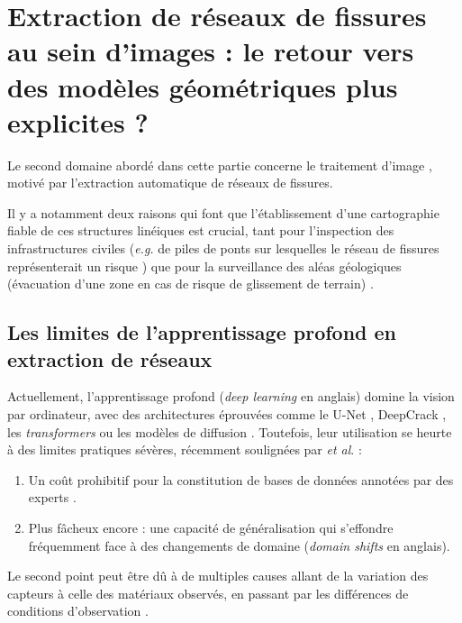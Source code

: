 \section{Extraction de réseaux de fissures au sein d'images : le retour vers des modèles géométriques plus explicites ?}

Le second domaine abordé dans cette partie concerne le traitement d'image \cite{jain1989fundamentals, Zerubia1995, Gonzalez2018ImageProcessing}, motivé par l'extraction automatique de réseaux de fissures. 

Il y a notamment deux raisons qui font que l'établissement d'une cartographie fiable de ces structures linéiques est crucial, tant pour l'inspection des infrastructures civiles (\emph{e.g.} de piles de ponts sur lesquelles le réseau de fissures représenterait un risque \cite{cerema_iqoa_ponts_dalles}) que pour la surveillance des aléas géologiques (évacuation d'une zone en cas de risque de glissement de terrain) \cite{bird2016coastal, fauchard2023diachronic}. 

\subsection{Les limites de l'apprentissage profond en extraction de réseaux}

Actuellement, l'apprentissage profond (\emph{deep learning} en anglais) domine la vision par ordinateur, avec des architectures éprouvées comme le U-Net \cite{Unet2015}, DeepCrack \cite{DeepCrack2019}, les \emph{transformers} \cite{CrackFormer2021} ou les modèles de diffusion \cite{CrackSegDiff2024}. 
Toutefois, leur utilisation se heurte à des limites pratiques sévères, récemment soulignées par  \emph{et al}. \cite{Zhang2025Review} : 
\begin{enumerate}
    \item Un coût prohibitif pour la constitution de bases de données annotées par des experts \cite{JosianeGANCrack2020}. 
    \item Plus fâcheux encore : une capacité de généralisation qui s'effondre fréquemment face à des changements de domaine \cite{Zhang2025Review} (\emph{domain shifts} en anglais).
\end{enumerate}

Le second point peut être dû à de multiples causes allant de la variation des capteurs à celle des matériaux observés, en passant par les différences de conditions d'observation \cite{Zhang2025Review}.

